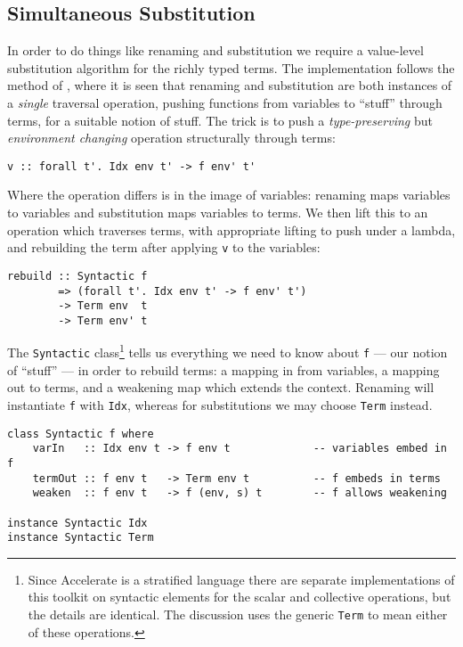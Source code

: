 \subsection{Simultaneous Substitution}
\label{sec:substitution}

In order to do things like renaming and substitution we require a value-level
substitution algorithm for the richly typed terms. The implementation follows
the method of \citet{McBride:2006up,McBride:2005jv}, where it is seen that
renaming and substitution are both instances of a \emph{single} traversal
operation, pushing functions from variables to ``stuff'' through terms, for a
suitable notion of stuff.
%
The trick is to push a \emph{type-preserving} but \emph{environment changing}
operation structurally through terms:
%
\begin{lstlisting}[style=haskell]
v :: forall t'. Idx env t' -> f env' t'
\end{lstlisting}

Where the operation differs is in the image of variables: renaming maps
variables to variables and substitution maps variables to terms. We then lift
this to an operation which traverses terms, with appropriate lifting to push
under a lambda, and rebuilding the term after applying \texttt{v} to the
variables:
%
\begin{lstlisting}[style=haskell]
rebuild :: Syntactic f
        => (forall t'. Idx env t' -> f env' t')
        -> Term env  t
        -> Term env' t
\end{lstlisting}

The \texttt{Syntactic} class\footnote{Since Accelerate is a stratified language
there are separate implementations of this toolkit on syntactic elements for the
scalar and collective operations, but the details are identical. The discussion
uses the generic \texttt{Term} to mean either of these operations.} tells us
everything we need to know about \texttt{f} --- our notion of ``stuff'' --- in
order to rebuild terms: a mapping in from variables, a mapping out to terms, and
a weakening map which extends the context. Renaming will instantiate \texttt{f}
with \texttt{Idx}, whereas for substitutions we may choose \texttt{Term}
instead.
%
\begin{lstlisting}[style=haskell]
class Syntactic f where
    varIn   :: Idx env t -> f env t             -- variables embed in f
    termOut :: f env t   -> Term env t          -- f embeds in terms
    weaken  :: f env t   -> f (env, s) t        -- f allows weakening

instance Syntactic Idx
instance Syntactic Term
\end{lstlisting}

